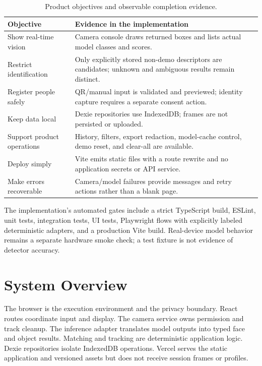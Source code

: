 \documentclass[11pt,oneside,openany]{report}
\begin{document}
\begin{table}[htbp]
\centering
\caption{Product objectives and observable completion evidence.}
\begin{tabularx}{\textwidth}{>{\raggedright\arraybackslash}p{}X}
\toprule
\textbf{Objective} & \textbf{Evidence in the implementation} \\
\midrule
Show real-time vision & Camera console draws returned boxes and lists actual model classes and scores. \\
Restrict identification & Only explicitly stored non-demo descriptors are candidates; unknown and ambiguous results remain distinct. \\
Register people safely & QR/manual input is validated and previewed; identity capture requires a separate consent action. \\
Keep data local & Dexie repositories use IndexedDB; frames are not persisted or uploaded. \\
Support product operations & History, filters, export redaction, model-cache control, demo reset, and clear-all are available. \\
Deploy simply & Vite emits static files with a route rewrite and no application secrets or API service. \\
Make errors recoverable & Camera/model failures provide messages and retry actions rather than a blank page. \\
\bottomrule
\end{tabularx}
\end{table}

The implementation's automated gates include a strict TypeScript build, ESLint, unit tests, integration tests, UI tests, Playwright flows with explicitly labeled deterministic adapters, and a production Vite build. Real-device model behavior remains a separate hardware smoke check; a test fixture is not evidence of detector accuracy.

\chapter{System Overview}
The browser is the execution environment and the privacy boundary. React routes coordinate input and display. The camera service owns permission and track cleanup. The inference adapter translates model outputs into typed face and object results. Matching and tracking are deterministic application logic. Dexie repositories isolate IndexedDB operations. Vercel serves the static application and versioned assets but does not receive session frames or profiles.
\end{document}
